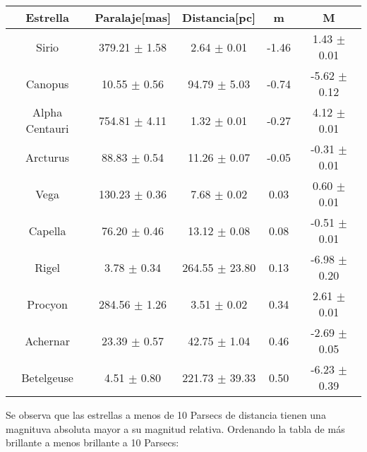 \documentclass[12pt]{article}
\begin{document}
\begin{table}[h]
\centering
	\begin{tabular}{|c|c|c|c|c|}
	\hline
Estrella & Paralaje[mas] & Distancia[pc] & m & M \\ \hline
Sirio & 379.21 $\pm$ 1.58 & 2.64 $\pm$ 0.01 & -1.46 & 1.43 $\pm$ 0.01 \\ \hline
Canopus & 10.55 $\pm$ 0.56 & 94.79 $\pm$ 5.03 & -0.74 & -5.62 $\pm$ 0.12 \\ \hline
Alpha Centauri & 754.81 $\pm$ 4.11 & 1.32 $\pm$ 0.01 & -0.27 & 4.12 $\pm$ 0.01 \\ \hline
Arcturus & 88.83 $\pm$ 0.54 & 11.26 $\pm$ 0.07 & -0.05 & -0.31 $\pm$ 0.01 \\ \hline
Vega & 130.23 $\pm$ 0.36 & 7.68 $\pm$ 0.02 & 0.03 & 0.60 $\pm$ 0.01 \\ \hline
Capella & 76.20 $\pm$ 0.46 & 13.12 $\pm$ 0.08 & 0.08 & -0.51 $\pm$ 0.01 \\ \hline
Rigel & 3.78 $\pm$ 0.34 & 264.55 $\pm$ 23.80 & 0.13 & -6.98 $\pm$ 0.20 \\ \hline
Procyon & 284.56 $\pm$ 1.26 & 3.51 $\pm$ 0.02 & 0.34 & 2.61 $\pm$ 0.01 \\ \hline
Achernar & 23.39 $\pm$ 0.57 & 42.75 $\pm$ 1.04 & 0.46 & -2.69 $\pm$ 0.05 \\ \hline
Betelgeuse & 4.51 $\pm$ 0.80 & 221.73 $\pm$ 39.33 & 0.50 & -6.23 $\pm$ 0.39 \\ \hline
	\end{tabular}
\end{table}
\vspace{1mm}





Se observa que las estrellas a menos de 10 Parsecs de distancia tienen una magnituva absoluta mayor a su magnitud relativa. Ordenando la tabla de más brillante a menos brillante a 10 Parsecs:
\end{document}
